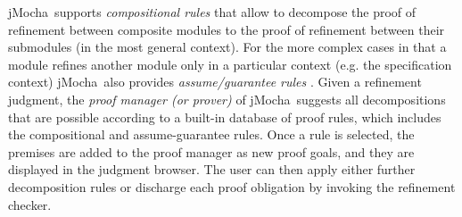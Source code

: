 \documentclass[10pt,twocolumn]{article}
\def\jmocha{{\small\sc jMocha}}
\begin{document}
\jmocha\ supports {\em compositional rules} that allow to decompose the 
proof of refinement between composite modules to the proof of refinement between  
their submodules (in the most general context). For the more complex cases in that 
a module refines another module only in a particular context (e.g. the specification
context) \jmocha\ also provides {\em assume/guarantee rules} \cite{Modules,HQR98} .
%
Given a refinement judgment, the \emph{proof manager (or prover)} of \jmocha\
suggests all decompositions that are possible according to a built-in 
database of proof rules, which includes the compositional and assume-guarantee rules.  
Once a rule is selected, the premises are added to
the proof manager as new proof goals, and they are displayed in the
judgment browser.  The user can then apply either further decomposition rules
or discharge each proof obligation by invoking the refinement checker.
%
\end{document}
